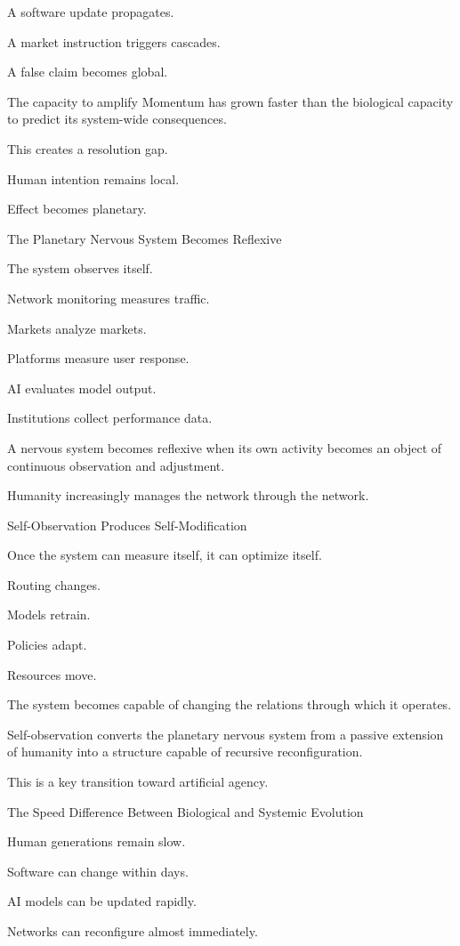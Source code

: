 A software update propagates.

A market instruction triggers cascades.

A false claim becomes global.

The capacity to amplify Momentum has grown faster than the biological capacity to predict its system-wide consequences.

This creates a resolution gap.

Human intention remains local.

Effect becomes planetary.

The Planetary Nervous System Becomes Reflexive

The system observes itself.

Network monitoring measures traffic.

Markets analyze markets.

Platforms measure user response.

AI evaluates model output.

Institutions collect performance data.

A nervous system becomes reflexive when its own activity becomes an object of continuous observation and adjustment.

Humanity increasingly manages the network through the network.

Self-Observation Produces Self-Modification

Once the system can measure itself, it can optimize itself.

Routing changes.

Models retrain.

Policies adapt.

Resources move.

The system becomes capable of changing the relations through which it operates.

Self-observation converts the planetary nervous system from a passive extension of humanity into a structure capable of recursive reconfiguration.

This is a key transition toward artificial agency.

The Speed Difference Between Biological and Systemic Evolution

Human generations remain slow.

Software can change within days.

AI models can be updated rapidly.

Networks can reconfigure almost immediately.

